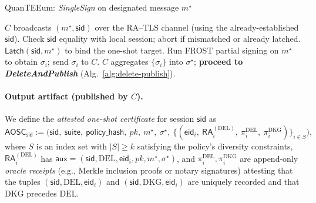 \documentclass[runningheads,orivec]{llncs}
\newcommand{\prot}{\textsf{QuanTEEum}}
\newcommand{\sid}{\mathsf{sid}}
\newcommand{\FROST}{\textsf{FROST}}
\begin{document}
\begin{algorithm}[!htbp]
\caption{\prot{}: \emph{SingleSign} on designated message $m^{\star}$}
\label{alg:sign}
\begin{small}
\begin{algorithmic}[1]
\State $C$ broadcasts $(m^{\star},\mathsf{sid})$ over the RA–TLS channel (using the already-established $\mathsf{sid}$).
  \State Check $\mathsf{sid}$ equality with local session; abort if mismatched or already latched.
  \State $\textsf{Latch}(\mathsf{sid},m^{\star})$ to bind the one-shot target.
  \State Run \FROST{} partial signing on $m^{\star}$ to obtain $\sigma_i$; send $\sigma_i$ to $C$.
\EndFor
\State $C$ aggregates $\{\sigma_i\}$ into $\sigma^{\star}$; \textbf{proceed to \emph{DeleteAndPublish}} (Alg.~\ref{alg:delete-publish}).
\end{algorithmic}
\end{small}
\end{algorithm}

\paragraph{Output artifact (published by $C$).}
We define the \emph{attested one-shot certificate} for session $\sid$ as
\[
\mathsf{AOSC}_\sid := \big(\sid,\ \mathsf{suite},\ \mathsf{policy\_hash},\ pk,\ m^{\star},\ \sigma^{\star},\ \{(\mathsf{eid}_i,\ \mathsf{RA}^{(\mathrm{DEL})}_i,\ \pi^{\mathrm{DEL}}_i,\ \pi^{\mathrm{DKG}}_i)\}_{i\in S}\big),
\]
where $S$ is an index set with $|S|\ge k$ satisfying the policy’s diversity constraints,
$\mathsf{RA}^{(\mathrm{DEL})}_i$ has $\mathsf{aux}=(\sid,\mathrm{DEL},\mathsf{eid}_i,pk,m^{\star},\sigma^{\star})$,
and $\pi^{\mathrm{DEL}}_i,\pi^{\mathrm{DKG}}_i$ are append-only \emph{oracle receipts} (e.g., Merkle inclusion proofs or notary signatures)
attesting that the tuples $(\sid,\mathrm{DEL},\mathsf{eid}_i)$ and $(\sid,\mathrm{DKG},\mathsf{eid}_i)$ are uniquely recorded and that
$\mathrm{DKG}$ precedes $\mathrm{DEL}$.
\end{document}
